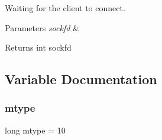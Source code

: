Waiting for the client to connect. 


\begin{DoxyParams}{Parameters}
{\em sockfd} & \\
\hline
\end{DoxyParams}
\begin{DoxyReturn}{Returns}
int sockfd 
\end{DoxyReturn}


\subsection{Variable Documentation}
\mbox{\label{srv_8c_a6e71692f0e74d6cd516fa62386afcfb4}} 
\subsubsection{mtype}
{\footnotesize\ttfamily long mtype = 10}

